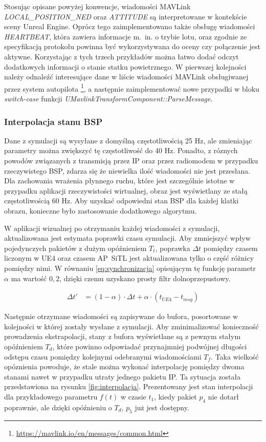 Stosując opisane powyżej konwencje, wiadomości MAVLink \emph{LOCAL\_POSITION\_NED} oraz \emph{ATTITUDE} są interpretowane w kontekście sceny Unreal Engine. Oprócz tego zaimplementowano także obsługę wiadomości \emph{HEARTBEAT}, która zawiera informacje m.~in. o trybie lotu, oraz zgodnie ze specyfikacją protokołu powinna być wykorzystywana do oceny czy połączenie jest aktywne. Korzystając z tych trzech przykładów można łatwo dodać odczyt dodatkowych informacji o stanie statku powietrznego. W pierwszej kolejności należy odnaleźć interesujące dane w liście wiadomości MAVLink obsługiwanej przez system autopilota \footnote{\url{https://mavlink.io/en/messages/common.html}}, a następnie zaimplementować nowe przypadki w bloku \emph{switch-case} funkcji \emph{UMavlinkTransformComponent::ParseMessage}.

\subsubsection{Interpolacja stanu BSP}
Dane z symulacji są wysyłane z domyślną częstotliwością 25 Hz, ale zmieniając parametry można zwiększyć tę częstotliwość do 40 Hz. Ponadto, z róznych powodów związanych z transmisją przez IP oraz przez radiomodem w przypadku rzeczywistego BSP, zdarza się że niewielka ilość wiadomości nie jest przesłana. Dla zachowania wrażenia płynnego ruchu, które jest szczególnie istotne w przypadku aplikacji rzeczywistości wirtualnej, obraz jest wyświetlany ze stałą częstotliwością 60 Hz. Aby uzyskać odpowiedni stan BSP dla każdej klatki obrazu, konieczne było zastosowanie dodatkowego algorytmu.

W aplikacji wizualnej po otrzymaniu każdej wiadomości z symulacji, aktualizowana jest estymata poprawki czasu symulacji. Aby zmniejszyć wpływ pojedynczych pakietów z dużym opóźnieniem $ T_t $, poprawka $ \Delta t $ pomiędzy czasem liczonym w UE4 oraz czasem AP~SiTL jest aktualizowana tylko o część różnicy pomiędzy nimi. W równaniu \ref{eq:synchronizacja} opisującym tę funkcję parametr $ \alpha $ ma wartość $ 0,2 $, dzięki czemu uzyskano prosty filtr dolnoprzepustowy.

\begin{align}
    \label{eq:synchronizacja}
    \Delta t' &= (1 - \alpha) \cdot \Delta t + \alpha \cdot (t_{UE4} - t_{msg})
\end{align}

Następnie otrzymane wiadomości są zapisywane do bufora, posortowane w kolejności w której zostały wysłane z symulacji. Aby zminimalizować konieczność prowadzenia ekstrapolacji, stany z bufora wyświetlane są z pewnym stałym opóźnieniem $ T_d $, które powinno odpowiadać przynajmniej podwójnej długości odstępu czasu pomiędzy kolejnymi odebranymi wiadomościami $ T_f $. Taka wielkość opóznienia powoduje, że stale można wykonać interpolację pomiędzy dwoma stanami nawet w przypadku utraty jednego pakietu IP. Ta sytuacja została przedstawiona na rysunku \ref{fig:interpolacja}. Prezentowany jest stan interpolacji dla przykładowego parametru $ f(t) $ w czasie $ t_1 $, kiedy pakiet $ p_4 $ nie dotarł poprawnie, ale dzięki opóźnieniu o $ T_d $, $ p_5 $ już jest dostępny.

